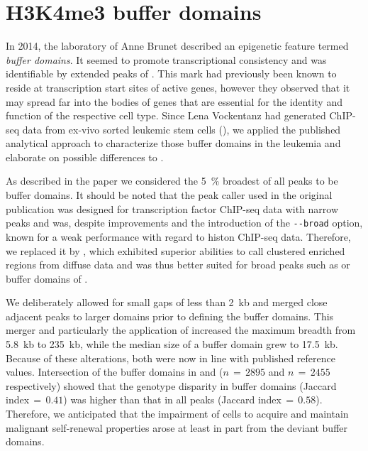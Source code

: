 \section{H3K4me3 buffer domains}
\label{chap:r:degenes:bufferdomains}

In 2014, the laboratory of Anne Brunet\cite{Benayoun2014} described an epigenetic feature termed \emph{buffer domains}. It seemed to promote transcriptional consistency and was identifiable by extended peaks of \hisfourthree. This mark had previously been known to reside at transcription start sites of active genes, however they observed that it may spread far into the bodies of genes that are essential for the identity and function of the respective cell type. Since Lena Vockentanz had generated \hisfourthree ChIP-seq data from ex-vivo sorted \mllafnine leukemic stem cells (\kithi), we applied the published analytical approach to characterize those buffer domains in the leukemia and elaborate on possible differences to \dnmtchip.

As described in the paper\cite{Benayoun2014} we considered the \SI{5}{\percent} broadest of all \hisfourthree peaks to be buffer domains. It should be noted that the peak caller \cite{Zhang2008} used in the original publication was designed for transcription factor ChIP-seq data with narrow peaks and was, despite improvements and the introduction of the \verb|--broad| option, known for a weak performance with regard to histon ChIP-seq data\cite{Thomas2017}. Therefore, we replaced it by \cite{Sicer}, which exhibited superior abilities to call clustered enriched regions from diffuse data\cite{Xu2014,Steinhauser2016} and was thus better suited for broad peaks such as \histhirtysixthree or buffer domains of \hisfourthree. 

We deliberately allowed for small gaps of less than \SI{2}{\kilo b} and merged close adjacent peaks to larger domains prior to defining the buffer domains. This merger and particularly the application of  increased the maximum breadth from \SI{5.8}{\kilo b} to \SI{235}{\kilo b}, while the median size of a buffer domain grew to \SI{17.5}{\kilo b}. Because of these alterations, both were now in line with published reference values. Intersection of the buffer domains in \dnmtwt and \dnmtchip ($n\,=\,2895$ and $n\,=\,2455$ respectively) showed that the genotype disparity in buffer domains (Jaccard index$\,=\,0.41$) was higher than that in all \hisfourthree peaks (Jaccard index$\,=\,0.58$). Therefore, we anticipated that the impairment of \dnmtchip cells to acquire and maintain malignant self-renewal properties arose at least in part from the deviant buffer domains. 

